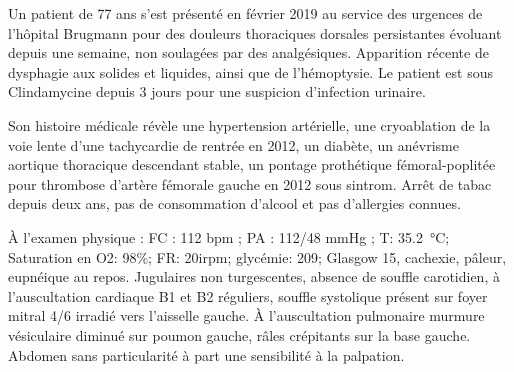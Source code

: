 \documentclass[./tfe]{subfiles}
\begin{document}
Un patient de 77 ans s’est présenté en février 2019 au service des urgences de l'hôpital Brugmann pour des douleurs thoraciques dorsales persistantes évoluant depuis une semaine, non soulagées par des analgésiques. Apparition récente de dysphagie aux solides et liquides, ainsi que de l’hémoptysie. Le patient est sous Clindamycine depuis 3 jours pour une suspicion d’infection urinaire.

Son histoire médicale révèle une hypertension artérielle, une cryoablation de la voie lente d’une tachycardie de rentrée en 2012, un diabète, un anévrisme aortique thoracique descendant stable, un pontage prothétique fémoral-poplitée pour thrombose d'artère fémorale gauche en 2012 sous sintrom. Arrêt de tabac depuis deux ans, pas de consommation d’alcool et pas d’allergies connues.

À l'examen physique : FC : 112 bpm ; PA : 112/48 mmHg ; T: \SI{35.2}{\celsius}; Saturation en O2: 98\%; FR: 20irpm; glycémie: 209; Glasgow 15, cachexie, pâleur, eupnéique au repos. Jugulaires non turgescentes, absence de souffle carotidien, à l’auscultation cardiaque B1 et B2 réguliers, souffle systolique présent sur foyer mitral 4/6 irradié vers l'aisselle gauche. À l’auscultation pulmonaire murmure vésiculaire diminué sur poumon gauche, râles crépitants sur la base gauche. Abdomen sans particularité à part une sensibilité à la palpation.
\end{document}
